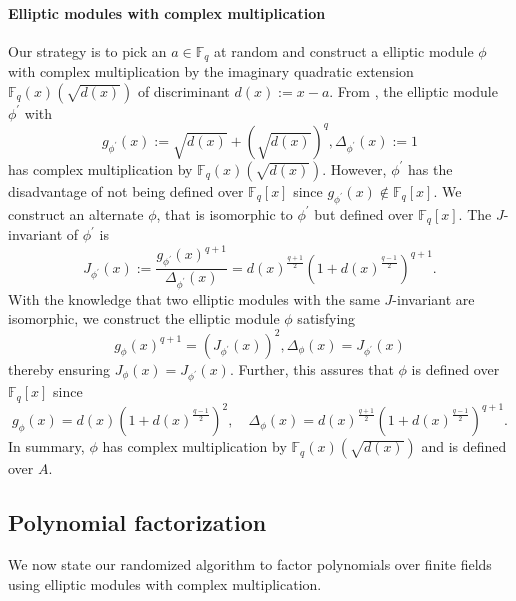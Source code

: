 \documentclass[12pt]{article}
\theoremstyle{plain}
\theoremstyle{definition}
\def\F{\ensuremath{\mathbb{F}}}
\newcommand{\D}{\Delta}
\begin{document}
\paragraph{Elliptic modules with complex multiplication}
Our strategy is to pick an $a \in \F_q$ at random and construct a elliptic module $\phi$ with 
complex multiplication by the imaginary quadratic extension $\F_q(x)(\sqrt{d(x)})$ of discriminant 
$d(x):=x-a$. From \cite{dor}, the elliptic module $\phi^\prime$ with 
\[ g_{\phi^\prime}(x):=\sqrt{d(x)}+\left(\sqrt{d(x)}\right)^q, \D_{\phi^\prime}(x) := 1 \]
has complex multiplication by $\F_q(x)(\sqrt{d(x)})$.
However, $\phi^\prime$ has the disadvantage of not being defined over $\F_q[x]$ since 
$g_{\phi^\prime}(x) \notin \F_q[x]$.
We construct an alternate $\phi$, that is isomorphic to $\phi^\prime$ but defined over $\F_q[x]$. 
The $J$-invariant \cite{gek} of $\phi^\prime$ is 
\[ J_{\phi^\prime}(x) := \frac{g_{\phi^\prime}(x)^{q+1}}{\D_{\phi^\prime}(x)} = 
d(x)^{\frac{q+1}{2}}\left(1+d(x)^{\frac{q-1}{2}}\right)^{q+1}. \]
With the knowledge that two elliptic modules with the same $J$-invariant are isomorphic, we 
construct the elliptic module $\phi$ satisfying 
\[ g_\phi(x)^{q+1} = (J_{\phi^\prime}(x))^2, \D_{\phi}(x)= J_{\phi^\prime}(x)\] thereby ensuring 
$J_{\phi}(x)=J_{\phi^\prime}(x)$. Further, this assures that $\phi$ is defined over $\F_q[x]$ since
\[g_\phi(x) = d(x)\left(1 + d(x)^{\frac{q-1}{2}}\right)^2, \quad  \D_\phi(x) = d(x)^{\frac{q + 
1}{2}}\left(1 + d(x)^{\frac{q-1}{2}}\right)^{q+1}. \]
In summary, $\phi$ has complex multiplication by $\F_q(x)(\sqrt{d(x)})$ and is defined over $A$.



\subsection{Polynomial factorization}
We now state our randomized algorithm to factor polynomials over finite fields using elliptic 
modules with complex multiplication.
\end{document}
